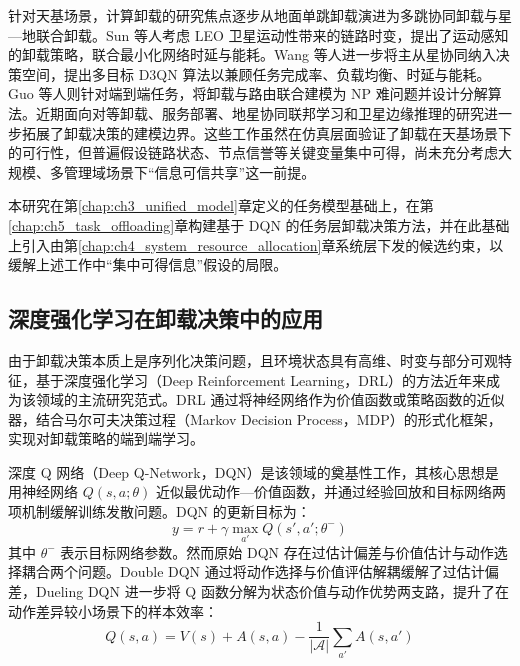 针对天基场景，计算卸载的研究焦点逐步从地面单跳卸载演进为多跳协同卸载与星—地联合卸载。Sun 等人\cite{Sun2024MCO}考虑 LEO 卫星运动性带来的链路时变，提出了运动感知的卸载策略，联合最小化网络时延与能耗。Wang 等人\cite{LMCECN2025}进一步将主从星协同纳入决策空间，提出多目标 D3QN 算法以兼顾任务完成率、负载均衡、时延与能耗。Guo 等人\cite{Guo2024E2E}则针对端到端任务，将卸载与路由联合建模为 NP 难问题并设计分解算法。近期面向对等卸载、服务部署、地星协同联邦学习和卫星边缘推理的研究进一步拓展了卸载决策的建模边界\cite{Zhang2024PeerOffloading,Tang2024TwoTimescaleJSAC,Zhai2024SECO,ref26,Fan2025SEI,Feng2026LatencyAware}。这些工作虽然在仿真层面验证了卸载在天基场景下的可行性，但普遍假设链路状态、节点信誉等关键变量集中可得，尚未充分考虑大规模、多管理域场景下“信息可信共享”这一前提。

本研究在第\ref{chap:ch3_unified_model}章定义的任务模型基础上，在第\ref{chap:ch5_task_offloading}章构建基于 DQN 的任务层卸载决策方法，并在此基础上引入由第\ref{chap:ch4_system_resource_allocation}章系统层下发的候选约束，以缓解上述工作中“集中可得信息”假设的局限。

\subsection{深度强化学习在卸载决策中的应用}
\label{subsec:ch2_drl_offloading}

由于卸载决策本质上是序列化决策问题，且环境状态具有高维、时变与部分可观特征，基于深度强化学习（Deep Reinforcement Learning，DRL）的方法近年来成为该领域的主流研究范式\cite{Mnih2015dqn,VanHasselt2016DoubleDQN,Wang2016Dueling,Tang2022DRL,Lim2022DRLOS}。DRL 通过将神经网络作为价值函数或策略函数的近似器，结合马尔可夫决策过程（Markov Decision Process，MDP）的形式化框架，实现对卸载策略的端到端学习。

深度 Q 网络（Deep Q-Network，DQN）是该领域的奠基性工作，其核心思想是用神经网络 $Q(s, a; \theta)$ 近似最优动作—价值函数，并通过经验回放和目标网络两项机制缓解训练发散问题\cite{Mnih2015dqn}。DQN 的更新目标为：
\begin{equation}
  y = r + \gamma \max_{a'} Q(s', a'; \theta^-)
  \label{eq:ch2_dqn_target}
\end{equation}
其中 $\theta^-$ 表示目标网络参数。然而原始 DQN 存在过估计偏差与价值估计与动作选择耦合两个问题。Double DQN 通过将动作选择与价值评估解耦缓解了过估计偏差，Dueling DQN 进一步将 Q 函数分解为状态价值与动作优势两支路，提升了在动作差异较小场景下的样本效率\cite{VanHasselt2016DoubleDQN,Wang2016Dueling,Lim2022DRLOS}：
\begin{equation}
  Q(s, a) = V(s) + A(s, a) - \frac{1}{|\mathcal{A}|}\sum_{a'} A(s, a')
  \label{eq:ch2_dueling}
\end{equation}

